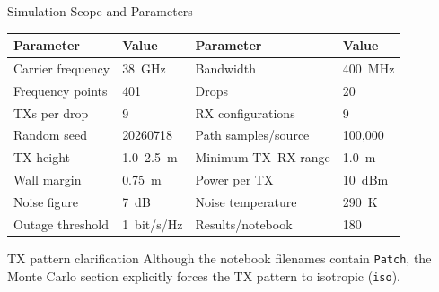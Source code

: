 \begin{frame}[t,shrink=12]{Simulation Scope and Parameters}
    \centering
    \small
    \begin{tabular}{@{}ll@{\qquad}ll@{}}
        \toprule
        \textbf{Parameter} & \textbf{Value} &
        \textbf{Parameter} & \textbf{Value} \\
        \midrule
        Carrier frequency & 38~GHz &
        Bandwidth & 400~MHz \\
        Frequency points & 401 &
        Drops & 20 \\
        TXs per drop & 9 &
        RX configurations & 9 \\
        Random seed & 20260718 &
        Path samples/source & 100,000 \\
        TX height & 1.0--2.5~m &
        Minimum TX--RX range & 1.0~m \\
        Wall margin & 0.75~m &
        Power per TX & 10~dBm \\
        Noise figure & 7~dB &
        Noise temperature & 290~K \\
        Outage threshold & 1~bit/s/Hz &
        Results/notebook & 180 \\
        \bottomrule
    \end{tabular}

    \vspace{5mm}
    \begin{alertblock}{TX pattern clarification}
        Although the notebook filenames contain \texttt{Patch}, the Monte
        Carlo section explicitly forces the TX pattern to isotropic
        (\texttt{iso}).
    \end{alertblock}
\end{frame}

